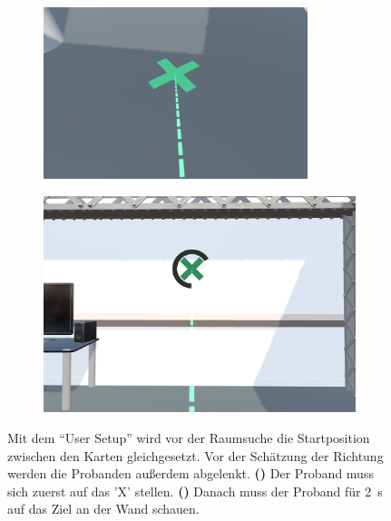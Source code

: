 \begin{figure}[h]
    \begin{subfigure}{0.49\linewidth}
        \centering
        \includegraphics[width=\linewidth, height=5cm]{figures/screenshots/user_setup_floor}
        \caption{}
        \label{sfig:user_setup_floor}
    \end{subfigure}%
    \hfill
    \begin{subfigure}{0.49\linewidth}
        \centering
        \includegraphics[width=\linewidth]{figures/screenshots/user_setup_wall}
        \caption{}
        \label{sfig:user_setup_wall}
    \end{subfigure}
    \caption{Mit dem \enquote{User Setup} wird vor der Raumsuche die Startposition zwischen den Karten gleichgesetzt. %
    Vor der Schätzung der Richtung werden die Probanden außerdem abgelenkt. %
    \textbf{()} Der Proband muss sich zuerst auf das 'X' stellen. %
    \textbf{()} Danach muss der Proband für \SI{2}{\second} auf das Ziel an der Wand schauen.}
    \label{fig:user_setup}
\end{figure}


